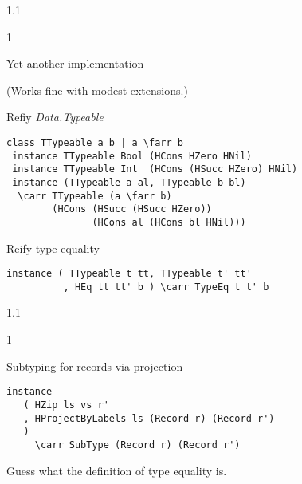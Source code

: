 \documentclass{slides}
\newenvironment{myslide}{\begin{slide}\color{Blue}\begin{boxedminipage}{1.1\hsize}\begin{boxedminipage}{1\hsize}\color{Black}
\vspace{-170\in}
}{%
\smallskip
\end{boxedminipage}
\end{boxedminipage}
\end{slide}}
\newenvironment{myslide}{\begin{slide}
}{%
\end{slide}}
\newenvironment{myslide}{\begin{slide}\color{White}\begin{boxedminipage}{1.1\hsize}\color{Black}
\vspace{-170\in}
}{%
\smallskip
\end{boxedminipage}
\end{slide}}
\newcommand{\header}[1]{{\large \color{Red} #1}}
\newcommand{\blau}[1]{{\vspace{-50\in}\normalsize \color{Blue} #1}}
\newcommand{\farr}{\ensuremath{\to}}
\newcommand{\carr}{\ensuremath{\Rightarrow}}
\begin{document}
\begin{myslide}

\header{Yet another implementation}

\vspace{-77\in}

{\tiny (Works fine with modest extensions.)}

\vspace{-42\in}

\blau{Refiy \emph{Data.Typeable}}

\medskip

\begin{Verbatim}[fontfamily=courier,fontsize=\small,commandchars=\\\{\}]
 class TTypeable a b | a \farr b
 instance TTypeable Bool (HCons HZero HNil)
 instance TTypeable Int  (HCons (HSucc HZero) HNil)
 instance (TTypeable a al, TTypeable b bl)
  \carr TTypeable (a \farr b)
        (HCons (HSucc (HSucc HZero))
               (HCons al (HCons bl HNil)))
\end{Verbatim}

\vspace{-77\in}

\blau{Reify type equality}

\medskip

\begin{Verbatim}[fontfamily=courier,fontsize=\small,commandchars=\\\{\}]
 instance ( TTypeable t tt, TTypeable t' tt'
          , HEq tt tt' b ) \carr TypeEq t t' b
\end{Verbatim}


\end{myslide}






\begin{myslide}

\header{Subtyping for records via projection}

\bigskip

\begin{Verbatim}[fontfamily=courier,fontsize=\small,commandchars=\\\{\}]
 instance
   ( HZip ls vs r'
   , HProjectByLabels ls (Record r) (Record r')
   )
     \carr SubType (Record r) (Record r')
\end{Verbatim}

{\small

Guess what the definition of type equality is.

}

\end{myslide}
\end{document}
